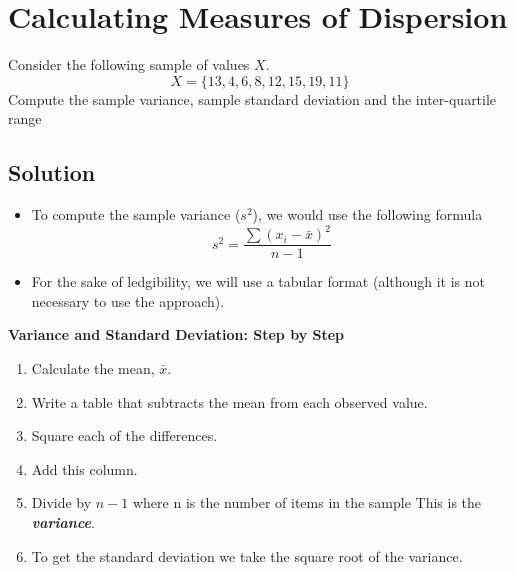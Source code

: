 \documentclass[a4paper,12pt]{article}
\begin{document}
\section*{Calculating Measures of Dispersion}

Consider the following sample of values $X$.
\[ X= \{13,4,6,8,12,15,19,11\}\]
Compute the sample variance, sample standard deviation and the inter-quartile range
\subsection*{Solution}
\begin{itemize}	
	\item To compute the sample variance ($s^2$), we would use the following formula
	\[ s^2 = \frac{\sum(x_i - \bar{x})^2}{n-1}\]
	\item For the sake of ledgibility, we will use a tabular format (although it is not necessary to use the approach).
\end{itemize}
\begin{framed}
\noindent \textbf{Variance and Standard Deviation: Step by Step}
\begin{enumerate}
	\item Calculate the mean, $\bar{x}$. 
	
	\item Write a table that subtracts the mean from each observed value.
	
	\item Square each of the differences.
	
	\item Add this column.
	
	\item Divide by $n-1$ where n is the number of items in the sample  This is the \textit{\textbf{variance}}.
	
	\item To get the standard deviation we take the square root of the variance.  
\end{enumerate}
\end{framed}
\end{document}
